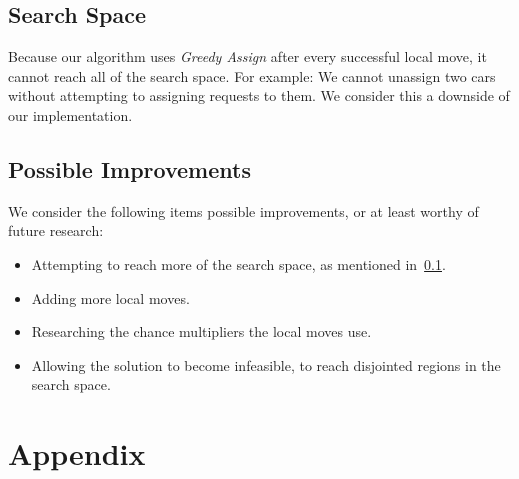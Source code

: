 \documentclass[11pt,a4paper]{article}
\begin{document}
    \subsection{Search Space}\label{subsec:search-space}
        Because our algorithm uses \textit{Greedy Assign} after every successful local move, it cannot reach all of the search space.
        For example: We cannot unassign two cars without attempting to assigning requests to them.
        We consider this a downside of our implementation.

    \subsection{Possible Improvements}\label{subsec:possible-improvements}
        We consider the following items possible improvements, or at least worthy of future research:
        \begin{itemize} \itemsep-0.25em
            \item Attempting to reach more of the search space, as mentioned in~\ref{subsec:search-space}.
            \item Adding more local moves.
            \item Researching the chance multipliers the local moves use.
            \item Allowing the solution to become infeasible, to reach disjointed regions in the search space.
        \end{itemize}


\pagebreak\section{Appendix}\label{sec:appendix}
\end{document}
